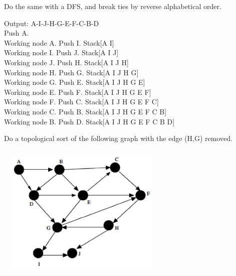 \documentclass[10pt]{article}
\newenvironment{exercise}[2][Exercise]{\begin{trivlist}
\item[\hskip \labelsep {\bfseries #1}\hskip \labelsep {\bfseries #2.}]}{\end{trivlist}}
\newenvironment{solution}[2][Solution]{\begin{trivlist}
\item[\hskip \labelsep {\bfseries #1}\hskip \labelsep {\bfseries #2.}]}{\end{trivlist}}
\theoremstyle{definition}
\begin{document}
\begin{exercise}{(2)} %
Do the same with a DFS, and break ties by reverse alphabetical order.\\
\end{exercise}
 
\begin{solution}{(2)}
Output: A-I-J-H-G-E-F-C-B-D\\
Push A.\\
Working node A. Push I. Stack[A I]\\
Working node I. Push J. Stack[A I J]\\
Working node J. Push H. Stack[A I J H]\\
Working node H. Push G. Stack[A I J H G]\\
Working node G. Push E. Stack[A I J H G E]\\
Working node E. Push F. Stack[A I J H G E F]\\
Working node F. Push C. Stack[A I J H G E F C]\\
Working node C. Push B. Stack[A I J H G E F C B]\\
Working node B. Push D. Stack[A I J H G E F C B D]\\
\end{solution}


\begin{exercise}{(3)}
Do a topological sort of the following graph with the edge (H,G) removed.\\
\\
\includegraphics[width=80mm,scale=0.2]{p3.PNG}\\
\end{exercise}
\end{document}
